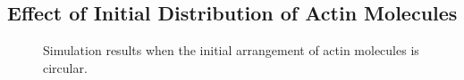 \documentclass[a4paper,12pt, oneside]{book}
\begin{document}
\subsection{Effect of Initial Distribution of Actin Molecules}

\begin{figure}[tbp]
 \caption{Simulation results when the initial arrangement of actin molecules is circular.}
 \label{fig:res4}
\end{figure}
\end{document}
